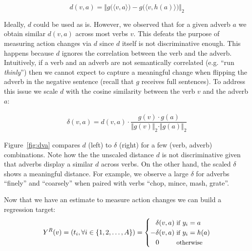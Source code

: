\documentclass[10pt,twocolumn,letterpaper]{article}
\begin{document}
\begin{equation}
    d(v, a) = \Big\Vert g\big(\langle v, a \rangle\big) - g\big(\langle v, h(a)\rangle\big) \Big\Vert _2
    \label{eq:distance}
\end{equation} 

Ideally, $d$ could be used as is. 
However, we observed that for a given adverb $a$ we obtain similar $d(v, a)$ across most verbs $v$. This defeats the purpose of measuring action changes via $d$ since $d$ itself is not discriminative enough. This 
happens 
because $d$ ignores the correlation between the verb and the adverb. Intuitively, if a verb and an adverb are not semantically correlated (e.g. ``run \textit{thinly}'') then we cannot expect to capture a meaningful change 
when flipping the adverb in the negative sentence  (recall that $g$ receives full sentences).
To address this issue we scale $d$ with the cosine similarity between the verb $v$ and the adverb $a$:

\vspace{-15pt}
\begin{align}
    \delta(v, a) = d(v, a) \cdot \dfrac{g(v) \cdot g(a)}{\Vert g(v) \Vert _2 \cdot \Vert g(a) \Vert _2}
\end{align}

\noindent Figure~\ref{fig:dva} compares $d$ (left) to $\delta$ (right) for a few (verb, adverb) combinations. 
Note how the the unscaled distance $d$ is not discriminative given that adverbs display a similar $d$ across verbs. On the other hand, the scaled $\delta$ shows a meaningful distance. For example, we observe a large $\delta$ for adverbs ``finely'' and ``coarsely'' when paired with verbs ``chop, mince, mash, grate''. 

Now that we have an estimate to measure action changes we can build a regression target:
\begin{equation}
Y^{R}(v) = (t_i,\forall i \in \{1, 2, \dots, A\}) =  
    \begin{cases}
       \phantom{-}\delta(v, a)& \hspace{-7pt}\text{\small if} \ y_i = a \\
       -\delta(v, a)& \hspace{-7pt} \text{\small if} \ y_i = h(a) \\
       \phantom{-}0& \hspace{-7pt}\text{\small otherwise}  
    \end{cases}
    \label{eq:reg_target}
\end{equation}
\end{document}
